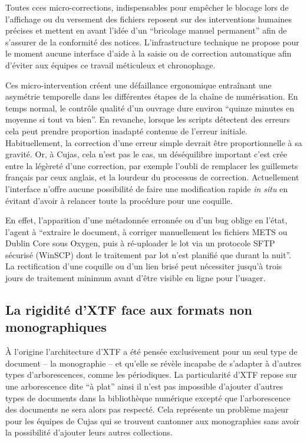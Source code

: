 Toutes cces micro-corrections, indispensables pour empêcher le blocage lors de l'affichage ou du versement des fichiers reposent sur des interventions humaines précises et mettent en avant l'idée d'un \enquote{bricolage manuel permanent} afin de s'assurer de la conformité des notices. L'infrastructure technique ne propose pour le moment aucune interface d'aide à la saisie ou de correction automatique afin d'éviter aux équipes ce travail méticuleux et chronophage. 

Ces micro-intervention créent une défaillance ergonomique entraînant une asymétrie temporelle dans les différentes étapes de la chaîne de numérisation. En temps normal, le contrôle qualité d'un ouvrage dure environ \enquote{quinze minutes en moyenne si tout va bien}. En revanche, lorsque les scripts détectent des erreurs cela peut prendre proportion inadapté contenue de l'erreur initiale. Habituellement, la correction d'une erreur simple devrait être proportionnelle à sa gravité. Or, à Cujas, cela n'est pas le cas, un déséquilibre important c'est crée entre la légèreté d'une correction, par exemple l'oubli de remplacer les guillemets français par ceux anglais, et la lourdeur du processus de correction. Actuellement l'interface n'offre aucune possibilité de faire une modification rapide \textit{in situ} en évitant d'avoir à relancer toute la procédure pour une coquille. 

En effet, l'apparition d'une métadonnée erronnée ou d'un bug oblige en l'état, l'agent à \enquote{extraire le document, à corriger manuellement les fichiers METS ou Dublin Core sous Oxygen, puis à ré-uploader le lot via un protocole SFTP sécurisé (WinSCP) dont le traitement par lot n'est planifié que durant la nuit}. La rectification d'une coquille ou d'un lien brisé peut nécessiter jusqu'à trois jours de traitement minimum avant d'être visible en ligne pour l'usager.  

\subsection{La rigidité d'XTF face aux formats non monographiques}
À l'origine l'architecture d'XTF a été pensée exclusivement pour un seul type de document -- la monographie -- et qu'elle se révèle incapabe de s'adapter à d'autres types d'arborescences, comme les périodiques. La particularité d'XTF repose sur une arborescence dite \enquote{à plat} ainsi il n'est pas impossible d'ajouter d'autres types de documents dans la bibliothèque numérique excepté que l'arborescence des documents ne sera alors pas respecté. Cela représente un problème majeur pour les équipes de Cujas qui se trouvent cantonner aux monographies sans avoir la possibilité d'ajouter leurs autres collections. 

